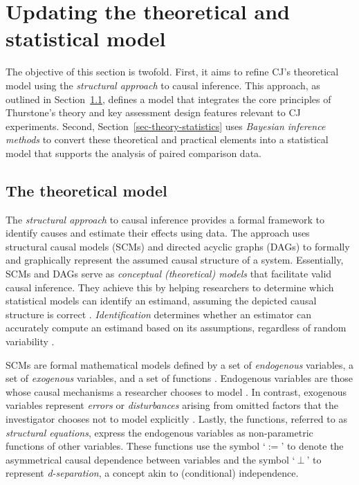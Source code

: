 \documentclass[
  authoryear,
  review,
  1p]{elsarticle}
\begin{document}
\section{Updating the theoretical and statistical
model}\label{sec-theory}

The objective of this section is twofold. First, it aims to refine CJ's
theoretical model using the \emph{structural approach} to causal
inference. This approach, as outlined in
Section~\ref{sec-theory-theoretical}, defines a model that integrates
the core principles of Thurstone's theory and key assessment design
features relevant to CJ experiments. Second,
Section~\ref{sec-theory-statistics} uses \emph{Bayesian inference
methods} to convert these theoretical and practical elements into a
statistical model that supports the analysis of paired comparison data.

\subsection{The theoretical model}\label{sec-theory-theoretical}

The \emph{structural approach} to causal inference provides a formal
framework to identify causes and estimate their effects using data. The
approach uses structural causal models (SCMs) and directed acyclic
graphs (DAGs)
\citep{Pearl_2009, Pearl_et_al_2016, Gross_et_al_2018, Neal_2020} to
formally and graphically represent the assumed causal structure of a
system. Essentially, SCMs and DAGs serve as \emph{conceptual
(theoretical) models} that facilitate valid causal inference. They
achieve this by helping researchers to determine which statistical
models can identify an estimand, assuming the depicted causal structure
is correct \citep{McElreath_2020}. \emph{Identification} determines
whether an estimator can accurately compute an estimand based on its
assumptions, regardless of random variability
\citep[pp.~4]{Schuessler_et_al_2023}.

SCMs are formal mathematical models defined by a set of
\emph{endogenous} variables, a set of \emph{exogenous} variables, and a
set of functions \citep{Pearl_2009, Cinelli_et_al_2020}. Endogenous
variables are those whose causal mechanisms a researcher chooses to
model \citep{Neal_2020}. In contrast, exogenous variables represent
\emph{errors} or \emph{disturbances} arising from omitted factors that
the investigator chooses not to model explicitly
\citep[pp.~27,68]{Pearl_2009}. Lastly, the functions, referred to as
\emph{structural equations}, express the endogenous variables as
non-parametric functions of other variables. These functions use the
symbol `\(:=\)' to denote the asymmetrical causal dependence between
variables and the symbol `\(\:\bot\:\)' to represent
\emph{d-separation}, a concept akin to (conditional) independence.
\end{document}
